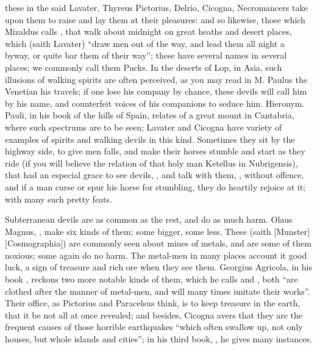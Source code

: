 these in the said Lavater, Thyreus  Pictorius, Delrio, Cicogna,  Necromancers take upon them to raise and lay them at their pleasures: and
so likewise, those which Mizaldus calls , that walk about
midnight on great heaths and desert places, which (saith
Lavater) \enquote{draw men out of the way, and lead them all night
a byway, or quite bar them of their way}; these have several names in several
places; we commonly call them Pucks. In the deserts of Lop, in Asia, such
illusions of walking spirits are often perceived, as you may read in M. Paulus
the Venetian his travels; if one lose his company by chance, these devils will
call him by his name, and counterfeit voices of his companions to seduce him.
Hieronym. Pauli, in his book of the hills of Spain, relates of a great
mount in Cantabria, where such spectrums are to be seen;
Lavater and Cicogna have variety of examples of spirits and walking devils in
this kind. Sometimes they sit by the highway side, to give men falls, and make
their horses stumble and start as they ride (if you will believe the relation
of that holy man Ketellus in Nubrigensis), that had an
especial grace to see devils, , and talk with
them, , without offence, and
if a man curse or spur his horse for stumbling, they do heartily rejoice at it;
with many such pretty feats.

Subterranean devils are as common as the rest, and do as much harm. Olaus
Magnus, , make six kinds of them; some
bigger, some less. These (saith
[Munster][Cosmographia]) are commonly
seen about mines of metals, and are some of them noxious; some again do no
harm. The metal-men in many places account it good luck, a sign of treasure and
rich ore when they see them. Georgius Agricola, in his book
, reckons two more
notable kinds of them, which he calls  and
, both \enquote{are clothed after the manner of metal-men, and will many
times imitate their works}. Their office, as Pictorius and Paracelsus think, is
to keep treasure in the earth, that it be not all at once revealed; and
besides, Cicogna avers that they are the frequent causes
of those horrible earthquakes \enquote{which often swallow up, not only houses, but
whole islands and cities}; in his third book, ,
he gives many instances.

